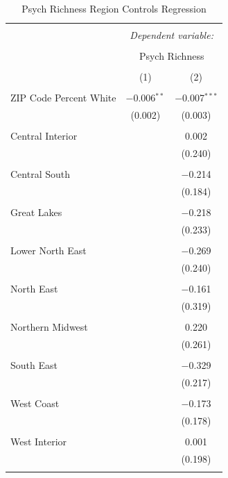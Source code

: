 \documentclass[
  man,floatsintext]{apa7}
\begin{document}
\begin{table}[!htbp] \centering 
  \caption{Psych Richness Region Controls Regression} 
  \label{tab:rich-control-regression} 
\tiny 
\begin{tabular}{@{\extracolsep{1pt}}lcc} 
\\[-1.8ex]\hline 
\hline \\[-1.8ex] 
 & \multicolumn{2}{c}{\textit{Dependent variable:}} \\ 
\cline{2-3} 
\\[-1.8ex] & \multicolumn{2}{c}{Psych Richness} \\ 
\\[-1.8ex] & (1) & (2)\\ 
\hline \\[-1.8ex] 
 ZIP Code Percent White & $-$0.006$^{**}$ & $-$0.007$^{***}$ \\ 
  & (0.002) & (0.003) \\ 
  & & \\ 
 Central Interior &  & 0.002 \\ 
  &  & (0.240) \\ 
  & & \\ 
 Central South &  & $-$0.214 \\ 
  &  & (0.184) \\ 
  & & \\ 
 Great Lakes &  & $-$0.218 \\ 
  &  & (0.233) \\ 
  & & \\ 
 Lower North East &  & $-$0.269 \\ 
  &  & (0.240) \\ 
  & & \\ 
 North East &  & $-$0.161 \\ 
  &  & (0.319) \\ 
  & & \\ 
 Northern Midwest &  & 0.220 \\ 
  &  & (0.261) \\ 
  & & \\ 
 South East &  & $-$0.329 \\ 
  &  & (0.217) \\ 
  & & \\ 
 West Coast &  & $-$0.173 \\ 
  &  & (0.178) \\ 
  & & \\ 
 West Interior &  & 0.001 \\ 
  &  & (0.198) \\ 
  & & \\ 

\end{tabular}
\end{table}
\end{document}
